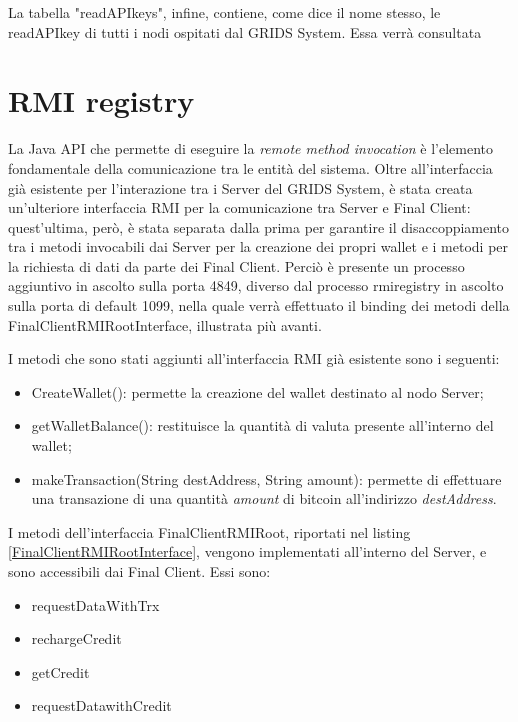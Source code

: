 La tabella "readAPIkeys", infine, contiene, come dice il nome stesso, le readAPIkey di tutti i nodi ospitati dal GRIDS System. Essa verrà consultata 

\section{RMI registry}
\label{c:integr:rmi}

La Java API che permette di eseguire la \textit{remote method invocation} è l'elemento fondamentale della comunicazione tra le entità del sistema. Oltre all'interfaccia già esistente per l'interazione tra i Server del GRIDS System, è stata creata un'ulteriore interfaccia RMI per la comunicazione tra Server e Final Client: quest'ultima, però, è stata separata dalla prima per garantire il disaccoppiamento tra i metodi invocabili dai Server per la creazione dei propri wallet e i metodi per la richiesta di dati da parte dei Final Client. Perciò è presente un processo aggiuntivo in ascolto sulla porta 4849, diverso dal processo rmiregistry in ascolto sulla porta di default 1099, nella quale verrà effettuato il binding dei metodi della FinalClientRMIRootInterface, illustrata più avanti.

I metodi che sono stati aggiunti all'interfaccia RMI già esistente sono i seguenti:

\begin{itemize}
    \item CreateWallet(): permette la creazione del wallet destinato al nodo Server;
    \item getWalletBalance(): restituisce la quantità di valuta presente all'interno del wallet;
    \item makeTransaction(String destAddress, String amount): permette di effettuare una transazione di una quantità \textit{amount} di bitcoin all'indirizzo \textit{destAddress}.
\end{itemize}

I metodi dell'interfaccia FinalClientRMIRoot, riportati nel listing \ref{FinalClientRMIRootInterface}, vengono implementati all'interno del Server, e sono accessibili dai Final Client. Essi sono:

\begin{itemize}
    \item requestDataWithTrx
    \item rechargeCredit
    \item getCredit
    \item requestDatawithCredit
\end{itemize}

